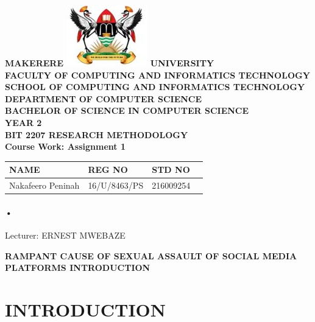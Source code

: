 \documentclass[12pt]{article}
\begin{document}
\begin{Huge}
\begin{center}
\begin{normalsize}
\textbf{MAKERERE \includegraphics[scale=0.5]{logo} UNIVERSITY }\\


\textbf{FACULTY OF COMPUTING AND INFORMATICS TECHNOLOGY} \\
\textbf{SCHOOL OF COMPUTING AND INFORMATICS TECHNOLOGY} \\
\textbf{DEPARTMENT OF COMPUTER SCIENCE} \\
\textbf{BACHELOR OF SCIENCE IN COMPUTER SCIENCE} \\
\textbf{YEAR 2} \\
\textbf{BIT 2207 RESEARCH METHODOLOGY} \\
\textbf{Course Work: Assignment 1}\\
\end{normalsize}
\end{center}
\end{Huge}

\begin{center}
\begin{tabular}{|l|l|l|c|}
\hline NAME  & REG NO & STD NO \\\hline
Nakafeero Peninah& 16/U/8463/PS & 216009254 \\\hline
\end{tabular}
\paragraph{•}
Lecturer: ERNEST MWEBAZE \\
\end{center}

\newpage

\begin{center}
\textbf{RAMPANT CAUSE OF SEXUAL ASSAULT OF SOCIAL MEDIA PLATFORMS
INTRODUCTION}\\
\end{center}

\section{INTRODUCTION}
\end{document}
